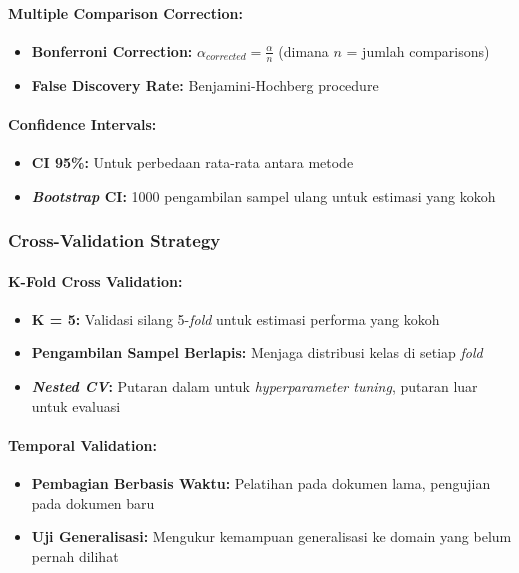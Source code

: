 \documentclass[12pt,a4paper]{article}
\begin{document}
\paragraph{Multiple Comparison Correction:}
\begin{itemize}[leftmargin=*, nosep]
\item \textbf{Bonferroni Correction:} $\alpha_{corrected} = \frac{\alpha}{n}$ (dimana $n$ = jumlah comparisons)
\item \textbf{False Discovery Rate:} Benjamini-Hochberg procedure
\end{itemize}

\paragraph{Confidence Intervals:}
\begin{itemize}[leftmargin=*, nosep]
\item \textbf{CI 95\%:} Untuk perbedaan rata-rata antara metode
\item \textbf{\textit{Bootstrap} CI:} 1000 pengambilan sampel ulang untuk estimasi yang kokoh
\end{itemize}

\subsubsection{Cross-Validation Strategy}
\paragraph{K-Fold Cross Validation:}
\begin{itemize}[leftmargin=*, nosep]
\item \textbf{K = 5:} Validasi silang 5-\textit{fold} untuk estimasi performa yang kokoh
\item \textbf{Pengambilan Sampel Berlapis:} Menjaga distribusi kelas di setiap \textit{fold}
\item \textbf{\textit{Nested CV}:} Putaran dalam untuk \textit{hyperparameter tuning}, putaran luar untuk evaluasi
\end{itemize}

\paragraph{Temporal Validation:}
\begin{itemize}[leftmargin=*, nosep]
\item \textbf{Pembagian Berbasis Waktu:} Pelatihan pada dokumen lama, pengujian pada dokumen baru
\item \textbf{Uji Generalisasi:} Mengukur kemampuan generalisasi ke domain yang belum pernah dilihat
\end{itemize}
\end{document}
